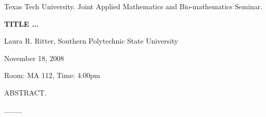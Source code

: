 \documentclass[oneside]{amsart}
\begin{document}
\begin{center}
Texas Tech University. Joint Applied Mathematics and Bio-mathematics Seminar.

\end{center}

\begin{center}

{\LARGE \uppercase{\textbf{
Title ... 
}}}

Laura R. Ritter, Southern Polytechnic State University

November 18, 2008

Room: MA 112, Time: 4:00pm

\end{center}

ABSTRACT.

......... 
\end{document}
